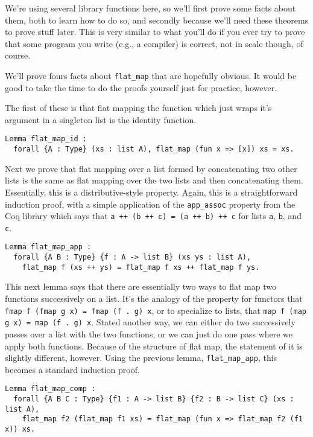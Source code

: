 We're using several library functions here, so we'll first prove some facts about them, both to learn how to do so, and secondly because we'll need these theorems to prove stuff later.
This is very similar to what you'll do if you ever try to prove that some program you write (e.g., a compiler) is correct, not in scale though, of course.

We'll prove fours facts about \texttt{flat_map} that are hopefully obvious.
It would be good to take the time to do the proofs yourself just for practice, however.

The first of these is that flat mapping the function which just wraps it's argument in a singleton list is the identity function.

\begin{verbatim}
Lemma flat_map_id :
  forall {A : Type} (xs : list A), flat_map (fun x => [x]) xs = xs.
\end{verbatim}

Next we prove that flat mapping over a list formed by concatenating two other lists is the same as flat mapping over the two lists and then concatenating them.
Essentially, this is a distributive-style property.
Again, this is a straightforward induction proof, with a simple application of the \texttt{app_assoc} property from the Coq library which says that \texttt{a ++ (b ++ c) = (a ++ b) ++ c} for lists \texttt{a}, \texttt{b}, and \texttt{c}.

\begin{verbatim}
Lemma flat_map_app :
  forall {A B : Type} {f : A -> list B} (xs ys : list A),
    flat_map f (xs ++ ys) = flat_map f xs ++ flat_map f ys.
\end{verbatim}

This next lemma says that there are essentially two ways to flat map two functions successively on a list.
It's the analogy of the property for functors that \texttt{fmap f (fmap g x) = fmap (f . g) x}, or to specialize to lists, that \texttt{map f (map g x) = map (f . g) x}.
Stated another way, we can either do two successively passes over a list with the two functions, or we can just do one pass where we apply both functions.
Because of the structure of flat map, the statement of it is slightly different, however.
Using the previous lemma, \texttt{flat_map_app}, this becomes a standard induction proof.

\begin{verbatim}
Lemma flat_map_comp :
  forall {A B C : Type} {f1 : A -> list B} {f2 : B -> list C} (xs : list A),
    flat_map f2 (flat_map f1 xs) = flat_map (fun x => flat_map f2 (f1 x)) xs.
\end{verbatim}

